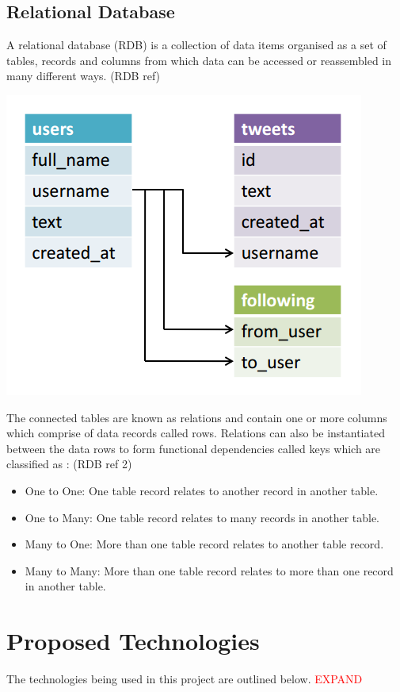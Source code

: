 \subsection{Relational Database}
A relational database (RDB) is a collection of data items organised as a set of tables, records and columns from which data can be accessed or reassembled in many different ways. (RDB ref)  \begin{center}\includegraphics[width=0.75\linewidth]{images/rdbmsmodel}\end{center}The connected tables are known as relations and contain one or more columns which comprise of data records called rows. Relations can also be instantiated between the data rows to form functional dependencies called keys which are classified as : (RDB ref 2)

\begin{itemize}
\item One to One: One table record relates to another record in another table.
\item One to Many: One table record relates to many records in another table.
\item Many to One: More than one table record relates to another table record.
\item Many to Many: More than one table record relates to more than one record in another table.
\end{itemize}
\section{Proposed Technologies}
The technologies being used in this project are outlined below. \textcolor{red}{EXPAND}
